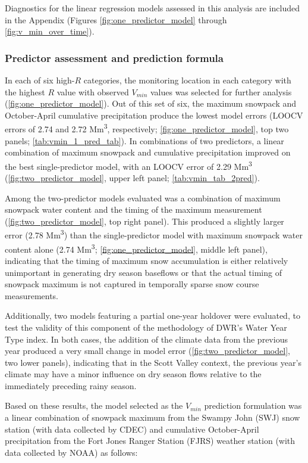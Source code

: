 \documentclass[hess, manuscript]{copernicus}
\begin{document}
Diagnostics for the linear regression models assessed in this analysis
are included in the Appendix (Figures \ref{fig:one_predictor_model}
through \ref{fig:v_min_over_time}).

\subsubsection{Predictor assessment and prediction formula}

In each of six high-\(R\) categories, the monitoring location in each
category with the highest \(R\) value with observed \(V_{min}\) values
was selected for further analysis (\autoref{fig:one_predictor_model}).
Out of this set of six, the maximum snowpack and October-April
cumulative precipitation produce the lowest model errors (LOOCV errors
of 2.74 and 2.72 Mm\textsuperscript{3}, respectively;
\autoref{fig:one_predictor_model}, top two panels;
\autoref{tab:vmin_1_pred_tab}). In combinations of two predictors, a
linear combination of maximum snowpack and cumulative precipitation
improved on the best single-predictor model, with an LOOCV error of 2.29
Mm\textsuperscript{3} (\autoref{fig:two_predictor_model}, upper left
panel; \autoref{tab:vmin_tab_2pred}).

Among the two-predictor models evaluated was a combination of maximum
snowpack water content and the timing of the maximum measurement
(\autoref{fig:two_predictor_model}, top right panel). This produced a
slightly larger error (2.78 Mm\textsuperscript{3}) than the
single-predictor model with maximum snowpack water content alone (2.74
Mm\textsuperscript{3}; \autoref{fig:one_predictor_model}, middle left
panel), indicating that the timing of maximum snow accumulation is
either relatively unimportant in generating dry season baseflows or that
the actual timing of snowpack maximum is not captured in temporally
sparse snow course measurements.

Additionally, two models featuring a partial one-year holdover were
evaluated, to test the validity of this component of the methodology of
DWR's Water Year Type index. In both cases, the addition of the climate
data from the previous year produced a very small change in model error
(\autoref{fig:two_predictor_model}, two lower panels), indicating that
in the Scott Valley context, the previous year's climate may have a
minor influence on dry season flows relative to the immediately
preceding rainy season.

Based on these results, the model selected as the \(V_{min}\) prediction
formulation was a linear combination of snowpack maximum from the Swampy
John (SWJ) snow station (with data collected by CDEC) and cumulative
October-April precipitation from the Fort Jones Ranger Station (FJRS)
weather station (with data collected by NOAA) as follows:
\end{document}
